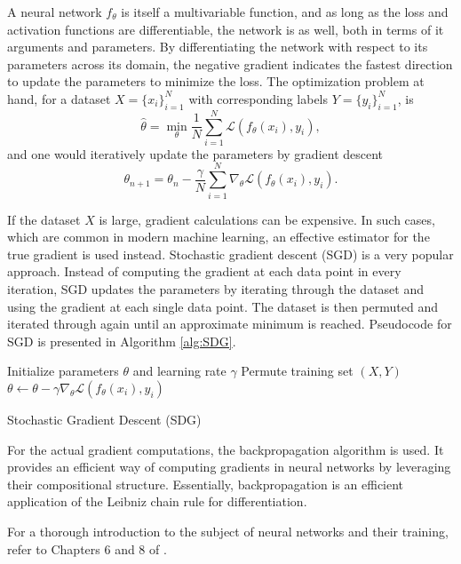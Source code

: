 \documentclass[../../thesis.tex]{subfiles}
\begin{document}
A neural network $f_\theta$ is itself a multivariable function, and as long as the loss and activation functions are differentiable, the network is as well, both in terms of it arguments and parameters. By differentiating the network with respect to its parameters across its domain, the negative gradient indicates the fastest direction to update the parameters to minimize the loss. The optimization problem at hand, for a dataset $X = \{x_i\}_{i=1}^N$ with corresponding labels $Y = \{y_i\}_{i=1}^N$, is
\[
   \widehat{\theta} = \min_{\theta} \frac{1}{N}\sum_{i=1}^N \mathcal{L}(f_\theta(x_i),y_i),
\]
and one would iteratively update the parameters by gradient descent 
\[
    \theta_{n+1} = \theta_{n} - \frac{\gamma}{N}\sum_{i=1}^N\nabla_\theta \mathcal{L}(f_\theta(x_i),y_i).
\]

If the dataset $X$ is large, gradient calculations can be expensive. In such cases, which are common in modern machine learning, an effective estimator for the true gradient is used instead. Stochastic gradient descent (SGD) is a very popular approach. Instead of computing the gradient at each data point in every iteration, SGD updates the parameters by iterating through the dataset and using the gradient at each single data point. The dataset is then permuted and iterated through again until an approximate minimum is reached. Pseudocode for SGD is presented in Algorithm \ref{alg:SDG}.

\begin{algorithm}
\begin{algorithmic}
    \State Initialize parameters $\theta$ and learning rate $\gamma$
        \State Permute training set $(X,Y)$
        \State $\theta \gets \theta - \gamma\nabla_\theta \mathcal{L}(f_\theta(x_i),y_i)$
    \EndFor
    \EndWhile
\end{algorithmic}
\caption{Stochastic Gradient Descent (SDG)}
\label{alg:SDG}
\end{algorithm}

For the actual gradient computations, the backpropagation algorithm is used. It provides an efficient way of computing gradients in neural networks by leveraging their compositional structure. Essentially, backpropagation is an efficient application of the Leibniz chain rule for differentiation.\newline

For a thorough introduction to the subject of neural networks and their training, refer to Chapters 6 and 8 of \cite{deeplearningbook}.
\end{document}
